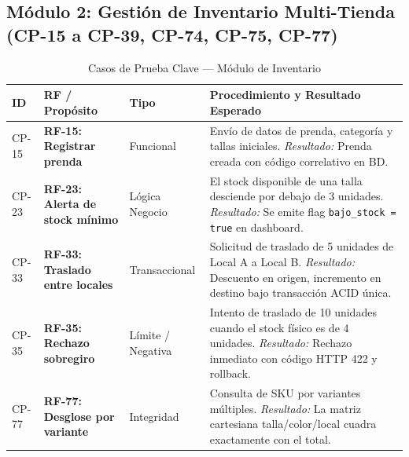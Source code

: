 \subsection{Módulo 2: Gestión de Inventario Multi-Tienda (CP-15 a CP-39, CP-74, CP-75, CP-77)}
\begin{table}[H]
\centering
\small
\begin{tabularx}{\textwidth}{>{\ttfamily\centering}p{1.4cm} >{\raggedright\bfseries}p{3.4cm} >{\raggedright}p{2.3cm} Y}
\toprule
\textbf{ID} & \textbf{RF / Propósito} & \textbf{Tipo} & \textbf{Procedimiento y Resultado Esperado} \\
\midrule
CP-15 & RF-15: Registrar prenda & Funcional & Envío de datos de prenda, categoría y tallas iniciales. \textit{Resultado:} Prenda creada con código correlativo en BD. \\
\addlinespace
CP-23 & RF-23: Alerta de stock mínimo & Lógica Negocio & El stock disponible de una talla desciende por debajo de 3 unidades. \textit{Resultado:} Se emite flag \texttt{bajo\_stock = true} en dashboard. \\
\addlinespace
CP-33 & RF-33: Traslado entre locales & Transaccional & Solicitud de traslado de 5 unidades de Local A a Local B. \textit{Resultado:} Descuento en origen, incremento en destino bajo transacción ACID única. \\
\addlinespace
CP-35 & RF-35: Rechazo sobregiro & Límite / Negativa & Intento de traslado de 10 unidades cuando el stock físico es de 4 unidades. \textit{Resultado:} Rechazo inmediato con código HTTP 422 y rollback. \\
\addlinespace
CP-77 & RF-77: Desglose por variante & Integridad & Consulta de SKU por variantes múltiples. \textit{Resultado:} La matriz cartesiana talla/color/local cuadra exactamente con el total. \\
\bottomrule
\end{tabularx}
\caption{Casos de Prueba Clave --- Módulo de Inventario}
\label{tab:cp_modulo2}
\end{table}

